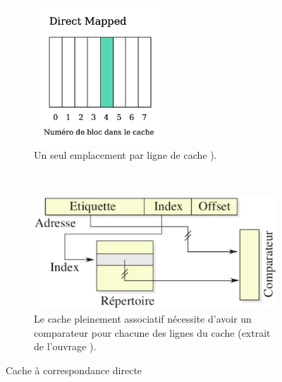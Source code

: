             \begin{figure}
            
                \centering
                \begin{subfigure}[b]{0.35\linewidth}
                    \includegraphics[width=5cm]{images/cache_direct.png}
                    \caption{Un seul emplacement par ligne de cache \cite{Meunier2017}).}
                    \label{pic:cache_direct_pti}
                \end{subfigure}
                ~ %
                \begin{subfigure}[b]{0.60\linewidth}
                    \includegraphics[width=\linewidth]{images/cache_circuit-direct.png}
                    \caption{Le cache pleinement associatif nécessite d'avoir un comparateur pour chacune des lignes du cache (extrait de l'ouvrage \cite{Blanchet2013}).}
                    \label{pic:cache_circuit-direct}
                \end{subfigure}
                \caption{Cache à correspondance directe}\label{pic:cachemappage_direct}
                        \vspace*{\floatsep}%



\end{figure}
